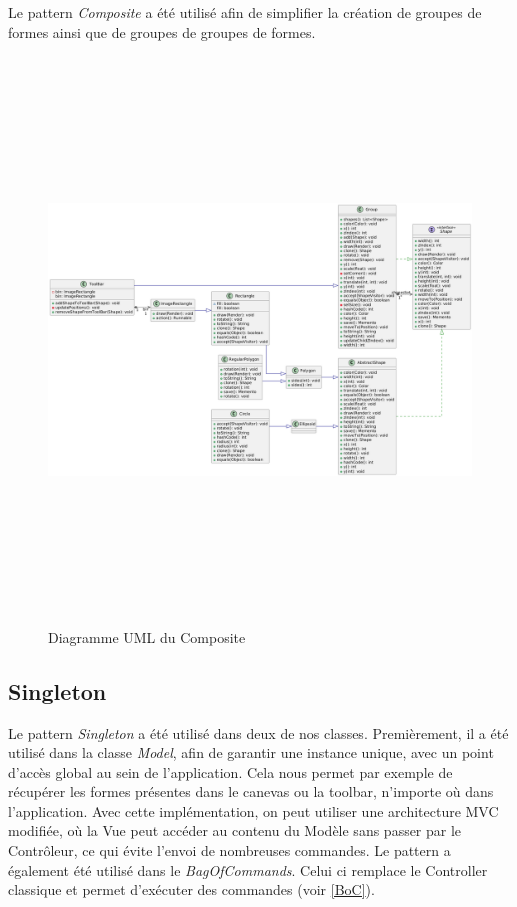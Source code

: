\documentclass{article}
\begin{document}
Le pattern \textit{Composite} a été utilisé afin de simplifier la création de groupes de formes ainsi que de groupes de groupes de formes.
\begin{figure}[h]
    \centering
    \includegraphics[width=\textwidth,height=15.0cm,keepaspectratio]{Composite.png}
    \caption{Diagramme UML du Composite}
    \label{Composite}
\end{figure}
\FloatBarrier

\subsection{Singleton}

Le pattern \textit{Singleton} a été utilisé dans deux de nos classes. Premièrement, il a été utilisé dans la classe \textit{Model}, 
afin de garantir une instance unique, avec un point d'accès global au sein de l'application.
Cela nous permet par exemple de récupérer les formes présentes dans le canevas ou la toolbar, n'importe où dans l'application. Avec cette implémentation,
on peut utiliser une architecture MVC modifiée, où la Vue peut accéder au contenu du Modèle sans passer par le Contrôleur, ce qui évite l'envoi
de nombreuses commandes.
Le pattern a également été utilisé dans le \textit{BagOfCommands}. Celui ci remplace le Controller classique et permet d'exécuter des commandes (voir \ref{BoC}).
\end{document}
